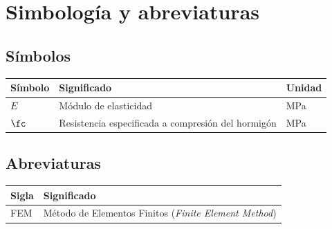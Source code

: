 \chapter*{Simbología y abreviaturas}

\section*{Símbolos}
\begin{tabular}{@{}p{2.5cm}p{9cm}l@{}}
  \toprule
  Símbolo & Significado & Unidad \\
  \midrule
  $E$   & Módulo de elasticidad & \unit{\mega\pascal} \\
  $\fc$ & Resistencia especificada a compresión del hormigón & \unit{\mega\pascal} \\
  \bottomrule
\end{tabular}

\section*{Abreviaturas}
\begin{tabular}{@{}p{2.5cm}p{11cm}@{}}
  \toprule
  Sigla & Significado \\
  \midrule
  FEM & Método de Elementos Finitos (\textit{Finite Element Method}) \\
  \bottomrule
\end{tabular}
